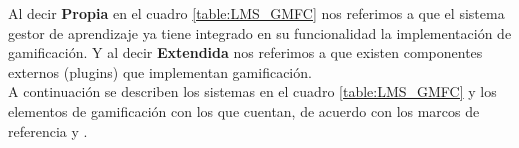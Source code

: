     \noindent Al decir \textbf{Propia} en el cuadro \ref{table:LMS_GMFC} nos referimos a que el sistema gestor de aprendizaje ya tiene integrado en su funcionalidad la implementación  de gamificación. Y al decir \textbf{Extendida} nos referimos a que existen componentes externos (plugins) que implementan gamificación. \\
    
    \noindent A continuación se describen los sistemas en el cuadro \ref{table:LMS_GMFC} y los elementos de gamificación con los que cuentan, de acuerdo con los marcos de referencia  y .
    
